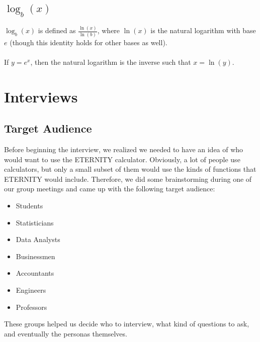 \documentclass[11pt,onside]{report}
\begin{document}
\subsection{$\log_b(x)$}
\begin{description}
$\log_b(x)$ is defined as $\frac{\ln(x)}{\ln(b)}$, where $\ln(x)$ is the natural logarithm with base $e$ (though this identity holds for other bases as well). \cite{log}\\ \\

If $y = e^x$, then the natural logarithm is the inverse such that $x = \ln(y)$. \cite{ln}
\end{description}

\section{Interviews}
\subsection{Target Audience}
\begin{description}
Before beginning the interview, we realized we needed to have an idea of who would want to use the ETERNITY calculator. Obviously, a lot of people use calculators, but only a small subset of them would use the kinds of functions that ETERNITY would include. Therefore, we did some brainstorming during one of our group meetings and came up with the following target audience:
\end{description}
\begin{itemize}
    \item Students
    \item Statisticians
    \item Data Analysts
    \item Businessmen
    \item Accountants
    \item Engineers
    \item Professors
\end{itemize}
\begin{description}
These groups helped us decide who to interview, what kind of questions to ask, and eventually the personas themselves.
\end{description}
\end{document}
